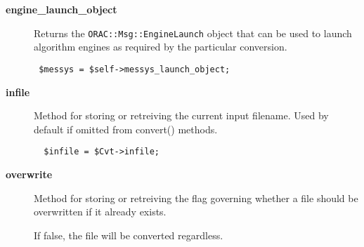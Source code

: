 \begin{description}

\item[{\textbf{engine\_launch\_object}}] \mbox{}

Returns the \texttt{ORAC::Msg::EngineLaunch} object that can be used
to launch algorithm engines as required by the particular
conversion.

\begin{verbatim}
 $messys = $self->messys_launch_object;
\end{verbatim}

\item[{\textbf{infile}}] \mbox{}

Method for storing or retreiving the current input filename.
Used by default if omitted from convert() methods.

\begin{verbatim}
  $infile = $Cvt->infile;
\end{verbatim}

\item[{\textbf{overwrite}}] \mbox{}

Method for storing or retreiving the flag governing whether
a file should be overwritten if it already exists.



If false, the file will be converted regardless.

\end{description}
